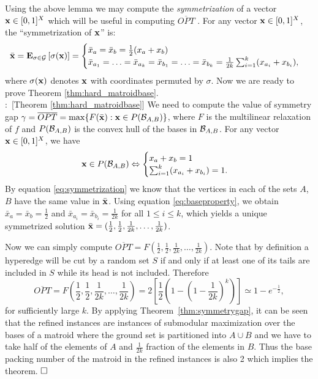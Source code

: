 \documentclass{article}[11pt]
\newcommand{\EE}[2]{{\bf{E}}_{#1}\left[#2\right]}
\renewenvironment{proof}{\noindent{\bf Proof}:~}{$\hfill \Box$\\}
\def\bx{{\bf x}}
\def\cB{{\cal B}}
\def\max{{\rm{max}}}
\begin{document}
Using the above lemma we may compute the {\em{symmetrization}} of a vector $\bx \in [0,1]^X$
which will be useful in computing $\overline{OPT}$ \cite{Vondrak09}.
For any vector $\bx\in [0,1]^X$, the ``symmetrization of $\bx$''  is:
\begin{equation}
\label{eq:symmetrization}
\bar{\bx}=\EE{\sigma\in\mathcal{G}}{\sigma(\bx)}=\begin{cases}
\bar{x}_a=\bar{x}_b=\frac12(x_a+x_b) \\
\bar{x}_{a_1}=\ldots=\bar{x}_{a_k}=\bar{x}_{b_1}=\ldots=\bar{x}_{b_k}
=\frac{1}{2k} \sum_{i=1}^k (x_{a_i}+x_{b_i}),
\end{cases}
\end{equation}
where $\sigma(\bx)$ denotes $\bx$ with coordinates permuted by $\sigma$.
Now we are ready to prove Theorem \ref{thm:hard_matroidbase}.\\


\begin{proof}[Theorem \ref{thm:hard_matroidbase}]
We need to compute the value of symmetry gap $\gamma=\overline{OPT}=
\max \{F(\bar{\bx}): \bx \in P(\cB_{A,B})\}$, where $F$ is the multilinear relaxation of $f$
and $P(\cB_{A,B})$ is the convex hull of the bases in $\cB_{A,B}$.
For any vector $\bx \in [0,1]^X$, we have 
\begin{equation}
\label{eq:baseproperty}
\bx\in P(\cB_{A,B}) \Leftrightarrow 
\begin{cases} x_a+x_b=1\\
\sum_{i=1}^k (x_{a_i}+x_{b_i})=1.
\end{cases}
\end{equation}
By equation \eqref{eq:symmetrization} we know that the vertices in each of the sets $A$, $B$
have the same value in $\bar{\bx}$. Using equation \eqref{eq:baseproperty},
we obtain $\bar{x}_a=\bar{x}_b=\frac12$ and $\bar{x}_{a_i}=\bar{x}_{b_i}=\frac{1}{2k}$
for all $1\leq i\leq k$,
which yields a unique symmetrized solution $\bar{\bx}=(\frac12,\frac12,
\frac{1}{2k},\ldots,\frac{1}{2k})$. 

Now we can simply compute $\overline{OPT} = F(\frac12,\frac12,\frac{1}{2k},\ldots,\frac{1}{2k})$. 
Note that by definition a hyperedge will be cut by a random set $S$
if and only if at least one of its tails are included in $S$ while its head is not included.
Therefore 
$$
\overline{OPT}=F\left(\frac12,\frac12,\frac{1}{2k},\ldots,\frac{1}{2k}\right)
 =2 \left[\frac{1}{2} \left(1-\left(1-\frac{1}{2k}\right)^k\right)\right] \simeq 1-e^{-\frac{1}{2}},
$$
for sufficiently large $k$. By applying Theorem~\ref{thm:symmetrygap}, it can be seen
that the refined instances are instances of submodular maximization over the bases
of a matroid where the ground set is partitioned into $A\cup B$ and we have to take half
of the elements of $A$ and $\frac{1}{2k}$ fraction of the elements in $B$.
Thus the base packing number of the matroid in the refined instances is also 2
which implies the theorem.
\end{proof}
\end{document}
